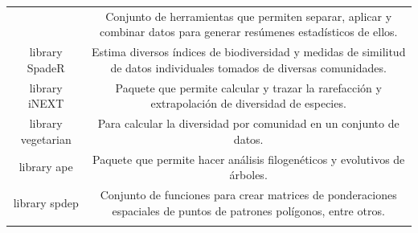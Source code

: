 \documentclass[11pt,]{article}
\begin{document}
\begin{longtable}[]{@{}cc@{}}
\begin{minipage}[t]{0.14\columnwidth}
\end{minipage} & \begin{minipage}[t]{0.80\columnwidth}\centering\strut
Conjunto de herramientas que permiten separar, aplicar y combinar datos
para generar resúmenes estadísticos de ellos.\strut
\end{minipage}\tabularnewline
\begin{minipage}[t]{0.14\columnwidth}\centering\strut
library SpadeR\strut
\end{minipage} & \begin{minipage}[t]{0.80\columnwidth}\centering\strut
Estima diversos índices de biodiversidad y medidas de similitud de datos
individuales tomados de diversas comunidades.\strut
\end{minipage}\tabularnewline
\begin{minipage}[t]{0.14\columnwidth}\centering\strut
library iNEXT\strut
\end{minipage} & \begin{minipage}[t]{0.80\columnwidth}\centering\strut
Paquete que permite calcular y trazar la rarefacción y extrapolación de
diversidad de especies.\strut
\end{minipage}\tabularnewline
\begin{minipage}[t]{0.14\columnwidth}\centering\strut
library vegetarian\strut
\end{minipage} & \begin{minipage}[t]{0.80\columnwidth}\centering\strut
Para calcular la diversidad por comunidad en un conjunto de datos.\strut
\end{minipage}\tabularnewline
\begin{minipage}[t]{0.14\columnwidth}\centering\strut
library ape\strut
\end{minipage} & \begin{minipage}[t]{0.80\columnwidth}\centering\strut
Paquete que permite hacer análisis filogenéticos y evolutivos de
árboles.\strut
\end{minipage}\tabularnewline
\begin{minipage}[t]{0.14\columnwidth}\centering\strut
library spdep\strut
\end{minipage} & \begin{minipage}[t]{0.80\columnwidth}\centering\strut
Conjunto de funciones para crear matrices de ponderaciones espaciales de
puntos de patrones polígonos, entre otros.\strut
\end{minipage}\tabularnewline
\begin{minipage}[t]{0.14\columnwidth}\centering\strut

\end{minipage}
\end{longtable}
\end{document}
